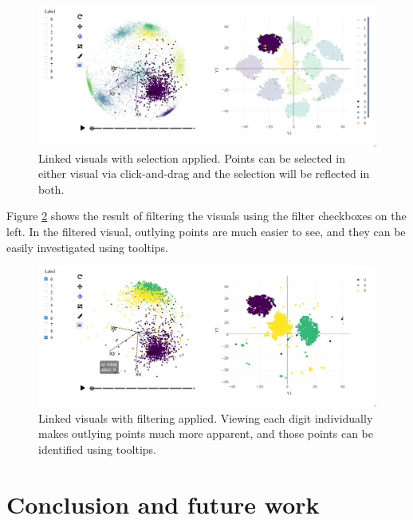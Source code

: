 \begin{Schunk}
\begin{figure}
\includegraphics[width=\textwidth]{figures/mnist/case-study-linked-brushing-selection} \caption[Linked visuals with selection applied]{Linked visuals with selection applied. Points can be selected in either visual via click-and-drag and the selection will be reflected in both.}\label{fig:linked-tsne-selection}
\end{figure}
\end{Schunk}

Figure \ref{fig:linked-tsne-filter} shows the result of filtering the
visuals using the filter checkboxes on the left. In the filtered visual,
outlying points are much easier to see, and they can be easily
investigated using tooltips.

\begin{Schunk}
\begin{figure}
\includegraphics[width=\textwidth]{figures/mnist/case-study-linked-brushing-filter} \caption[Linked visuals with filtering applied]{Linked visuals with filtering applied. Viewing each digit individually makes outlying points much more apparent, and those points can be identified using tooltips.}\label{fig:linked-tsne-filter}
\end{figure}
\end{Schunk}

\pagebreak

\hypertarget{ch:futurework}{%
\section{Conclusion and future work}\label{ch:futurework}}

